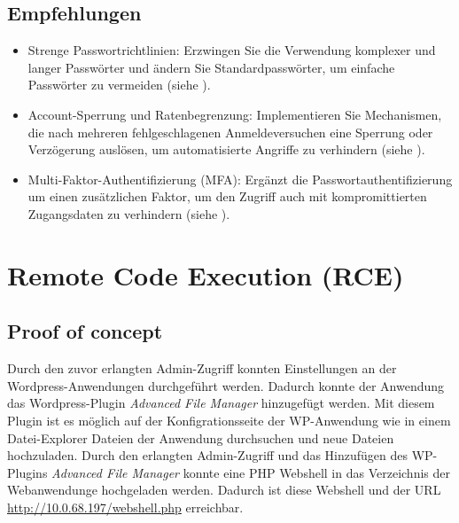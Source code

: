 \subsection*{Empfehlungen}
\begin{itemize}
    \item Strenge Passwortrichtlinien: Erzwingen Sie die Verwendung komplexer und langer Passwörter und ändern Sie Standardpasswörter, um einfache Passwörter zu vermeiden (siehe \cite{bsi_passwords}).
    \item Account-Sperrung und Ratenbegrenzung: Implementieren Sie Mechanismen, die nach mehreren fehlgeschlagenen Anmeldeversuchen eine Sperrung oder Verzögerung auslösen, um automatisierte Angriffe zu verhindern (siehe \cite{owaspAuthenticationOWASP}).
    \item Multi-Faktor-Authentifizierung (MFA): Ergänzt die Passwortauthentifizierung um einen zusätzlichen Faktor, um den Zugriff auch mit kompromittierten Zugangsdaten zu verhindern (siehe \cite{owaspAuthenticationOWASP}).
\end{itemize}


\section{\makecvssbadge Remote Code Execution (RCE)}

\subsection*{Proof of concept}
Durch den zuvor erlangten Admin-Zugriff konnten Einstellungen an der Wordpress-Anwendungen durchgeführt werden. Dadurch konnte der Anwendung das Wordpress-Plugin \textit{Advanced File Manager} hinzugefügt werden. Mit diesem Plugin ist es möglich auf der Konfigrationsseite der WP-Anwendung wie in einem Datei-Explorer Dateien der Anwendung durchsuchen und neue Dateien hochzuladen. Durch den erlangten Admin-Zugriff und das Hinzufügen des WP-Plugins \textit{Advanced File Manager} konnte eine PHP Webshell in das Verzeichnis der Webanwendunge hochgeladen werden. Dadurch ist diese Webshell und der URL \url{http://10.0.68.197/webshell.php} erreichbar. 

